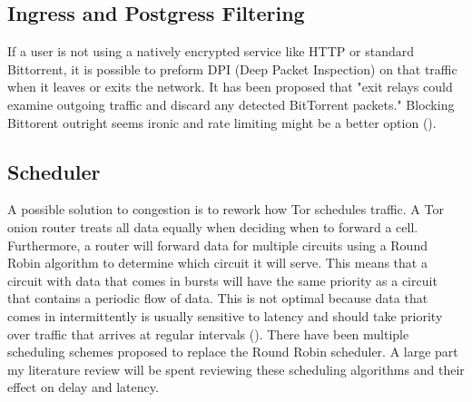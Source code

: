 \documentclass[letterpaper,13pt]{texMemo}
\begin{document}
    \subsection*{Ingress and Postgress Filtering}
    If a user is not using a natively encrypted service like HTTP or standard Bittorrent, it is
    possible to preform DPI (Deep Packet Inspection) on that traffic when it leaves or exits the
    network. It has been proposed that "exit relays could examine outgoing traffic and discard any
    detected BitTorrent packets." Blocking Bittorent outright seems ironic and rate limiting
    might be a better option (\citeauthor[2]{Moore}).

    \subsection*{Scheduler}
    A possible solution to congestion is to rework how Tor schedules traffic. A Tor onion router
    treats all data equally when deciding when to forward a cell. Furthermore, a router will forward
    data for multiple circuits using a Round Robin algorithm to determine which circuit it will
    serve. This means that a circuit with data that comes in bursts will have the same priority as a
    circuit that contains a periodic flow of data. This is not optimal because data that comes in
    intermittently is usually sensitive to latency and should take priority over traffic that
    arrives at regular intervals (\citeauthor[2]{unfair}). There have been multiple scheduling
    schemes proposed to replace the Round Robin scheduler. A large part my literature review will be
    spent reviewing these scheduling algorithms and their effect on delay and latency.
\end{document}
